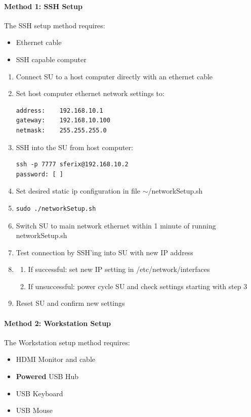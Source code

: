 \paragraph{Method 1: SSH Setup}
The SSH setup method requires:
\begin{itemize}
\item{Ethernet cable}
\item{SSH capable computer}
\end{itemize}

\begin{enumerate}
\item{Connect SU to a host computer directly with an ethernet cable}
\item{Set host computer ethernet network settings to:
\begin{verbatim}
address:	192.168.10.1
gateway:	192.168.10.100
netmask:	255.255.255.0
\end{verbatim}}
\item{SSH into the SU from host computer:
\begin{verbatim}
ssh -p 7777 sferix@192.168.10.2
password: [	]
\end{verbatim}}
\item{Set desired static ip configuration in file $\sim$/networkSetup.sh}
\item{\begin{verbatim}
sudo ./networkSetup.sh
\end{verbatim}}
\item{Switch SU to main network ethernet within 1 minute of running networkSetup.sh}
\item{Test connection by SSH'ing into SU with new IP address}
\item{
\begin{enumerate}
\item{If successful: set new IP setting in /etc/network/interfaces}
\item{If unsuccessful: power cycle SU and check settings starting with step 3}
\end{enumerate}}
\item{Reset SU and confirm new settings}
\end{enumerate}

\paragraph{Method 2: Workstation Setup}
The Workstation setup method requires:
\begin{itemize}
\item{HDMI Monitor and cable}
\item{{\bf Powered} USB Hub}
\item{USB Keyboard}
\item{USB Mouse}
\end{itemize}

